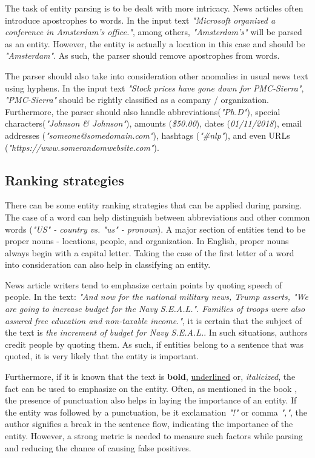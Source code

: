 \documentclass{article}
\begin{document}
		The task of entity parsing is to be dealt with more intricacy. News articles often introduce apostrophes to words. In the input text \textit{"Microsoft organized a conference in Amsterdam's office."}, among others, \textit{"Amsterdam's"} will be parsed as an entity. However, the entity is actually a location in this case and should be \textit{"Amsterdam"}. As such, the parser should remove apostrophes from words.\
		
		The parser should also take into consideration other anomalies in usual news text using hyphens. In the input text \textit{"Stock prices have gone down for PMC-Sierra"}, \textit{"PMC-Sierra"} should be rightly classified as a company / organization. Furthermore, the parser should also handle abbreviations(\textit{"Ph.D"}), special characters(\textit{"Johnson \& Johnson"}), amounts (\textit{\$50.00}), dates (\textit{01/11/2018}), email addresses (\textit{"someone@somedomain.com"}), hashtags (\textit{"\#nlp"}), and even URLs (\textit{"https://www.somerandomwebsite.com"}).

		\subsection{Ranking strategies} 
		There can be some entity ranking strategies that can be applied during parsing. The case of a word can help distinguish between abbreviations and other common words (\textit{"US" - country vs. "us" - pronoun}). A major section of entities tend to be proper nouns - locations, people, and organization. In English, proper nouns always begin with a capital letter. Taking the case of the first letter of a word into consideration can also help in classifying an entity.\
		
		 
		News article writers tend to emphasize certain points by quoting speech of people. In the text: \textit{"And now for the national military news, Trump asserts, "We are going to increase budget for the Navy S.E.A.L.". Families of troops were also assured free education and non-taxable income."}, it is certain that the subject of the text is \textit{the increment of budget for Navy S.E.A.L.}. In such situations, authors credit people by quoting them. As such, if entities belong to a sentence that was quoted, it is very likely that the entity is important.
		
		Furthermore, if it is known that the text is \textbf{bold}, \underline{underlined} or, \textit{italicized}, the fact can be used to emphasize on the entity. Often, as mentioned in the book \cite{Jurafsky}, the presence of punctuation also helps in laying the importance of an entity. If the entity was followed by a punctuation, be it exclamation \textit{"!"} or comma \textit{","}, the author signifies a break in the sentence flow, indicating the importance of the entity. However, a strong metric is needed to measure such factors while parsing and reducing the chance of causing false positives.
		
\end{document}
